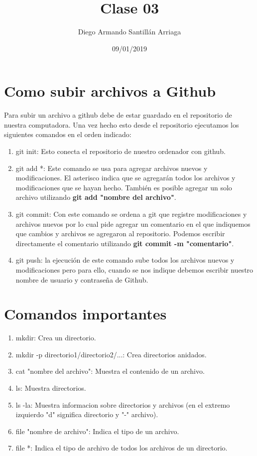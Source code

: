\documentclass[letter paper, 12pt, oneside]{article}
\title{\Huge Clase 03}
\author{Diego Armando Santillán Arriaga}
\date{09/01/2019}
\begin{document}
	\maketitle
\newpage
\section{Como subir archivos a Github}

Para subir un archivo a github debe de estar guardado en el repositorio de nuestra computadora. Una vez hecho esto desde el repositorio ejecutamos los siguientes comandos en el orden indicado:

\begin{enumerate}
\item{git init}: Esto conecta el repositorio de nuestro ordenador con github.

\item{git add *}: Este comando se usa para agregar archivos nuevos y modificaciones. El asterisco indica que se agregarán todos los archivos y modificaciones que se hayan hecho. También es posible agregar un solo archivo utilizando \textbf{git add "nombre del archivo"}.
 

\item{git commit}: Con este comando se ordena a git que registre modificaciones y archivos nuevos por lo cual pide agregar un comentario en el que indiquemos que cambios y archivos se agregaron al repositorio. Podemos escribir directamente el comentario utilizando \textbf{git commit -m "comentario"}. 

\item{git push}: la ejecución de este comando sube todos los archivos nuevos y modificaciones pero para ello, cuando se nos indique debemos escribir nuestro nombre de usuario y contraseña de Github.

\end{enumerate}

\section{Comandos importantes}

\begin{enumerate}
\item{mkdir}: Crea un directorio.


\item{mkdir -p directorio1/directorio2/...}: Crea directorios anidados.


\item{cat "nombre del archivo"}: Muestra el contenido de un archivo.


\item{ls}: Muestra directorios.


\item{ls -la}: Muestra informacion sobre directorios y archivos (en el extremo izquierdo "d" significa directorio y "-" archivo).


\item{file "nombre de archivo"}: Indica el tipo de un archivo. 

\item{file *}: Indica el tipo de archivo de todos los archivos de un directorio. 
\end{enumerate}
\end{document}
